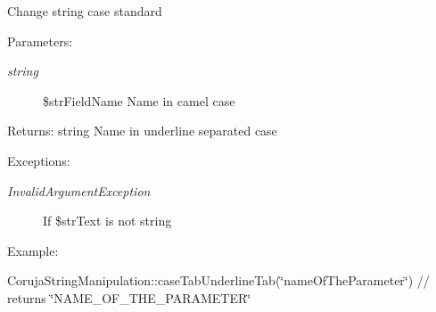 Change string case standard

\begin{Desc}
\item[Parameters:]
\begin{description}
\item[{\em string}]\$strFieldName Name in camel case \end{description}
\end{Desc}
\begin{Desc}
\item[Returns:]string Name in underline separated case \end{Desc}
\begin{Desc}
\item[Exceptions:]
\begin{description}
\item[{\em InvalidArgumentException}]If \$strText is not string \end{description}
\end{Desc}
\begin{Desc}
\item[Example:]\end{Desc}
CorujaStringManipulation::caseTabUnderlineTab(\char`\"{}nameOfTheParameter\char`\"{}) // returns \char`\"{}NAME\_\-OF\_\-THE\_\-PARAMETER\char`\"{}

